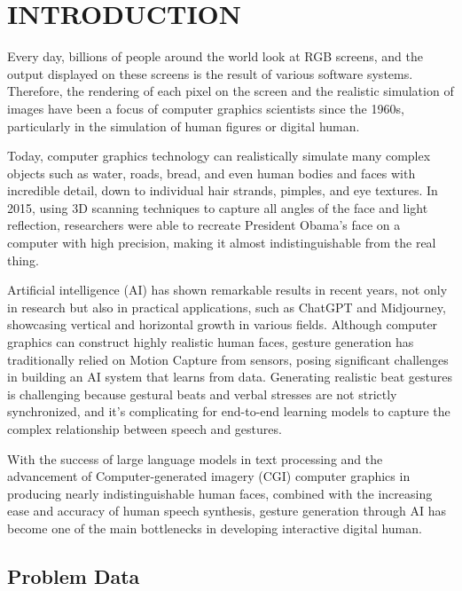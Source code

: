 \section{INTRODUCTION}
\label{sec:introduction}

Every day, billions of people around the world look at RGB screens, and the output displayed on these screens is the result of various software systems. Therefore, the rendering of each pixel on the screen and the realistic simulation of images have been a focus of computer graphics scientists since the 1960s, particularly in the simulation of human figures or digital human.

Today, computer graphics technology can realistically simulate many complex objects such as water, roads, bread, and even human bodies and faces with incredible detail, down to individual hair strands, pimples, and eye textures. In 2015, using 3D scanning techniques \cite{metallo2015scanning} to capture all angles of the face and light reflection, researchers were able to recreate President Obama's face on a computer with high precision, making it almost indistinguishable from the real thing.

Artificial intelligence (AI) has shown remarkable results in recent years, not only in research but also in practical applications, such as ChatGPT and Midjourney, showcasing vertical and horizontal growth in various fields. Although computer graphics can construct highly realistic human faces, gesture generation has traditionally relied on Motion Capture from sensors, posing significant challenges in building an AI system that learns from data. Generating realistic beat gestures is challenging because gestural beats and verbal stresses are not strictly synchronized, and it's complicating for end-to-end learning models to capture the complex relationship between speech and gestures.


With the success of large language models in text processing and the advancement of Computer-generated imagery (CGI) computer graphics in producing nearly indistinguishable human faces, combined with the increasing ease and accuracy of human speech synthesis, gesture generation through AI has become one of the main bottlenecks in developing interactive digital human.


\subsection{Problem Data}
\label{sec:Data}


